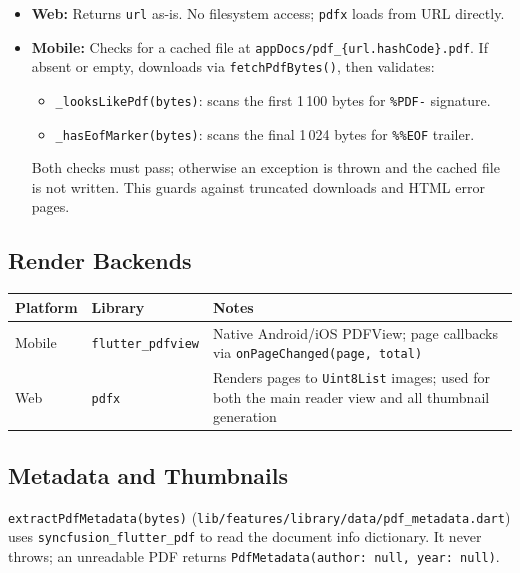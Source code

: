 \documentclass[11pt,a4paper]{article}
\begin{document}
\begin{itemize}
  \item \textbf{Web:} Returns \texttt{url} as-is. No filesystem access; \texttt{pdfx}
    loads from URL directly.
  \item \textbf{Mobile:} Checks for a cached file at
    \texttt{appDocs/pdf\_\{url.hashCode\}.pdf}. If absent or empty, downloads via
    \texttt{fetchPdfBytes()}, then validates:
    \begin{itemize}
      \item \texttt{\_looksLikePdf(bytes)}: scans the first 1\,100 bytes for
        \texttt{\%PDF-} signature.
      \item \texttt{\_hasEofMarker(bytes)}: scans the final 1\,024 bytes for
        \texttt{\%\%EOF} trailer.
    \end{itemize}
    Both checks must pass; otherwise an exception is thrown and the cached file is not
    written. This guards against truncated downloads and HTML error pages.
\end{itemize}

\subsection{Render Backends}

\vspace{4pt}
\begin{tabularx}{\textwidth}{@{}L{2.4cm} L{3.4cm} L{7.8cm}@{}}
  \toprule
  \textbf{Platform} & \textbf{Library} & \textbf{Notes} \\
  \midrule
  Mobile & \texttt{flutter\_pdfview} & Native Android/iOS PDFView; page callbacks via
    \texttt{onPageChanged(page, total)} \\
  Web & \texttt{pdfx} & Renders pages to \texttt{Uint8List} images; used for both the
    main reader view and all thumbnail generation \\
  \bottomrule
\end{tabularx}

\subsection{Metadata and Thumbnails}

\texttt{extractPdfMetadata(bytes)} (\texttt{lib/features/library/data/pdf\_metadata.dart})
uses \texttt{syncfusion\_flutter\_pdf} to read the document info dictionary. It never
throws; an unreadable PDF returns \texttt{PdfMetadata(author: null, year: null)}.
\end{document}
